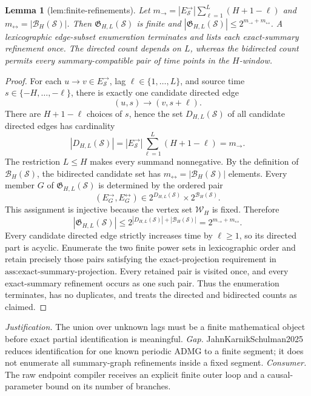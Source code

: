 \documentclass{article}
\newtheorem{lemma}{Lemma}
\begin{document}
\begin{lemma}[lem:finite-refinements]\label{lem:finite-refinements}
Let \(m_{\to}=|E_{\mathcal S}^{\to}|\sum_{\ell=1}^{L}(H+1-\ell)\) and \(m_{\leftrightarrow}=|\mathcal B_H(\mathcal S)|\). Then \(\mathfrak G_{H,L}(\mathcal S)\) is finite and \(|\mathfrak G_{H,L}(\mathcal S)|\le 2^{m_{\to}+m_{\leftrightarrow}}\). A lexicographic edge-subset enumeration terminates and lists each exact-summary refinement once. The directed count depends on \(L\), whereas the bidirected count permits every summary-compatible pair of time points in the \(H\)-window.
\end{lemma}
\begin{proof}
For each \(u\to v\in E_{\mathcal S}^{\to}\), lag \(\ell\in\{1,\ldots,L\}\), and source time \(s\in\{-H,\ldots,-\ell\}\), there is exactly one candidate directed edge
\[
(u,s)\longrightarrow(v,s+\ell).
\]
There are \(H+1-\ell\) choices of \(s\), hence the set \(D_{H,L}(\mathcal S)\) of all candidate directed edges has cardinality
\[
|D_{H,L}(\mathcal S)|
=|E_{\mathcal S}^{\to}|\sum_{\ell=1}^{L}(H+1-\ell)
=m_{\to}.
\tag{4}
\]
The restriction \(L\le H\) makes every summand nonnegative.  By the definition of \(\mathcal B_H(\mathcal S)\), the bidirected candidate set has \(m_{\leftrightarrow}=|\mathcal B_H(\mathcal S)|\) elements.  Every member \(G\) of \(\mathfrak G_{H,L}(\mathcal S)\) is determined by the ordered pair
\[
(E_G^{\to},E_G^{\leftrightarrow})
\in 2^{D_{H,L}(\mathcal S)}\times2^{\mathcal B_H(\mathcal S)}.
\]
This assignment is injective because the vertex set \(\mathcal W_H\) is fixed.  Therefore
\[
|\mathfrak G_{H,L}(\mathcal S)|
\le 2^{|D_{H,L}(\mathcal S)|+|\mathcal B_H(\mathcal S)|}
=2^{m_{\to}+m_{\leftrightarrow}}.
\]
Every candidate directed edge strictly increases time by \(\ell\ge1\), so its directed part is acyclic.  Enumerate the two finite power sets in lexicographic order and retain precisely those pairs satisfying the exact-projection requirement in \(\text{ass:exact-summary-projection}\).  Every retained pair is visited once, and every exact-summary refinement occurs as one such pair.  Thus the enumeration terminates, has no duplicates, and treats the directed and bidirected counts as claimed.
\end{proof}
\par\smallskip\noindent \textit{Justification.} The union over unknown lags must be a finite mathematical object before exact partial identification is meaningful. \textit{Gap.} JahnKarnikSchulman2025 reduces identification for one known periodic ADMG to a finite segment; it does not enumerate all summary-graph refinements inside a fixed segment. \textit{Consumer.} The raw endpoint compiler receives an explicit finite outer loop and a causal-parameter bound on its number of branches.
\end{document}
